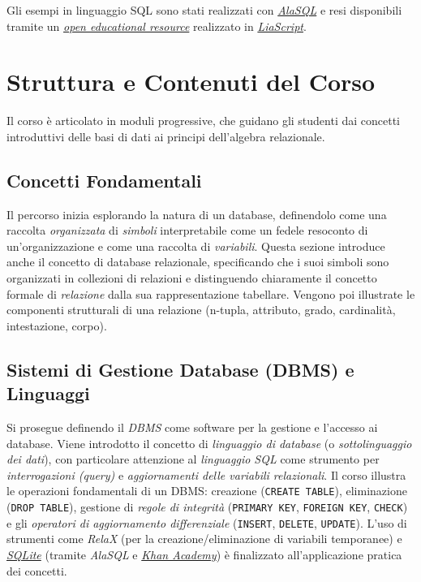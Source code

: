 \documentclass[withtimes]{easychair}
\begin{document}
Gli esempi in linguaggio SQL sono stati realizzati con \href{https://alasql.org/}{\emph{AlaSQL}} e resi disponibili tramite un \href{http://liascript.github.io/course/?https://raw.githubusercontent.com/gionatamassibenincasa/database-didattici/main/algebra_delle_relazioni/README.md}{\emph{open educational resource}} realizzato in \href{https://liascript.github.io/}{\emph{LiaScript}}.

\section{Struttura e Contenuti del Corso}\label{struttura-e-contenuti-del-corso}

Il corso è articolato in moduli progressive, che guidano gli studenti dai concetti introduttivi delle basi di dati ai principi dell'algebra relazionale.

\subsection{Concetti Fondamentali}\label{concetti-fondamentali}

Il percorso inizia esplorando la natura di un database, definendolo come una raccolta \emph{organizzata} di \emph{simboli} interpretabile come un fedele resoconto di un'organizzazione e come una raccolta di \emph{variabili}. Questa sezione introduce anche il concetto di database relazionale, specificando che i suoi simboli sono organizzati in collezioni di relazioni e distinguendo chiaramente il concetto formale di \emph{relazione} dalla sua rappresentazione tabellare. Vengono poi illustrate le componenti strutturali di una relazione (n-tupla, attributo, grado, cardinalità, intestazione, corpo).

\subsection{Sistemi di Gestione Database (DBMS) e Linguaggi}\label{sistemi-di-gestione-database-dbms-e-linguaggi}

Si prosegue definendo il \emph{DBMS} come software per la gestione e l'accesso ai database. Viene introdotto il concetto di \emph{linguaggio di database} (o \emph{sottolinguaggio dei dati}), con particolare attenzione al \emph{linguaggio SQL} come strumento per \emph{interrogazioni (query)} e \emph{aggiornamenti delle variabili relazionali}. Il corso illustra le operazioni fondamentali di un DBMS: creazione (\texttt{CREATE\ TABLE}), eliminazione (\texttt{DROP\ TABLE}), gestione di \emph{regole di integrità} (\texttt{PRIMARY\ KEY}, \texttt{FOREIGN\ KEY}, \texttt{CHECK}) e gli \emph{operatori di aggiornamento differenziale} (\texttt{INSERT}, \texttt{DELETE}, \texttt{UPDATE}). L'uso di strumenti come \emph{RelaX} (per la creazione/eliminazione di variabili temporanee) e \href{https://sqlite.org/}{\emph{SQLite}} (tramite  \emph{AlaSQL} e \href{https://it.khanacademy.org/computer-programming/new/sql}{\emph{Khan Academy}}) è finalizzato all'applicazione pratica dei concetti.
\end{document}
